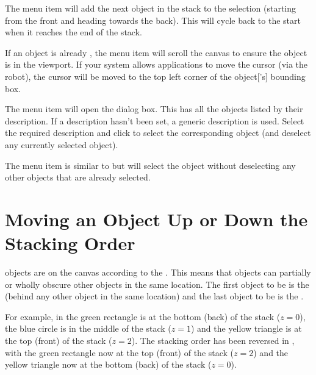 
The  menu item will add
the next \gls{object} in the \gls{stack} to the selection (starting from
the \gls{front} and heading towards the \gls{back}). This will cycle back to
the start when it reaches the end of the stack.


If an \gls{object} is already \selected, the 
menu item will scroll the \gls{canvas} to ensure the \gls{object} is
in the viewport. If your system allows applications to move the
cursor (via the \gls{robot}), the cursor will be moved to the top left corner of the
\gls{object}['s] bounding box.


The  menu item will open the
 dialog box. This has all the \glspl{object}
listed by their description.  If a description hasn't been set, a
generic description is used.  Select the required description and
click  to select the corresponding \gls{object} (and
deselect any currently selected \gls{object}).


The  menu item is similar to 
 but will select the \gls{object}
without deselecting any other \glspl{object} that are already
selected.

\section{Moving an Object Up or Down the Stacking Order}\label{sec:moveupordown}

\Glspl{object} are  on the
\gls{canvas} according to the
. This means that objects can
partially or wholly obscure other objects in the same location.
The first object to be 
is the  (behind any other object in the same
location) and the last object to be 
is the .

For example, in  the green rectangle is
at the bottom (\gls{back}) of the stack ($z=0$), the blue circle is in
the middle of the stack ($z=1$) and the yellow triangle is at the
top (\gls{front}) of the stack ($z=2$). The stacking order has
been reversed in , with the green
rectangle now at the top (front) of the stack ($z=2$) and
the yellow triangle now at the bottom (back) of the stack
($z=0$).

